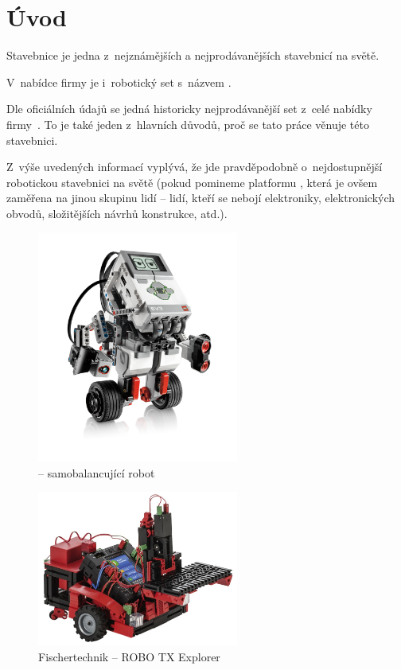 \chapter{Úvod}

Stavebnice \lego{ }je jedna z~nejznámějších a nejprodávanějších stavebnicí na světě. 

V~nabídce firmy \lego{ }je i~robotický set s~názvem \legoM. 

Dle oficiálních údajů se jedná historicky nejprodávanější set z~celé nabídky firmy~\cite{legoGizmodo_SalesStatistic}. 
To je také jeden z~hlavních důvodů, proč se tato práce věnuje této stavebnici. 

Z~výše uvedených informací vyplývá, že jde pravděpodobně o~nejdostupnější robotickou stavebnici na světě (pokud pomineme platformu \arduino, která je ovšem zaměřena na jinou skupinu lidí -- lidí, kteří se nebojí elektroniky, elektronických obvodů, složitějších návrhů konstrukce, atd.).

\begin{figure}[h]
	\centering
	\includegraphics[width=250px]{images/lego-mindstorms-ev3_Robotics-for-Kids.png}
	\caption[\legoEV{ }-- samobalancující robot]{\legoEV{ }-- samobalancující robot\protect\footnotemark}
	\label{fig:lego-mindstorms-ev3_Robotics-for-Kids}
\end{figure}



\begin{figure}[h]
	\centering
	\includegraphics[width=250px]{images/fischertechnik_ROBO-TX-Explorer_02.jpg}
	\caption[Fischertechnik -- ROBO TX Explorer]{Fischertechnik -- ROBO TX Explorer\protect\footnotemark}
	\label{fig:fischertechnik_ROBO-TX-Explorer}
\end{figure}

